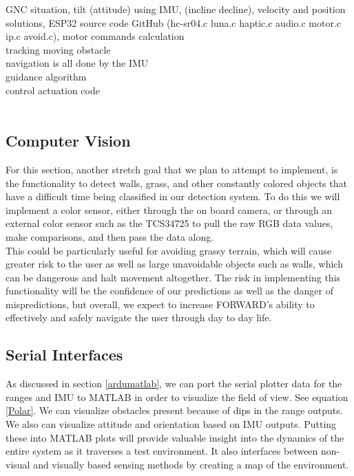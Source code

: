 \noindent GNC situation, tilt (attitude) using IMU, (incline decline), velocity and position solutions, ESP32 source code GitHub (hc-sr04.c luna.c haptic.c audio.c motor.c ip.c avoid.c), motor commands calculation\\

tracking moving obstacle\\

navigation is all done by the IMU\\

guidance algorithm\\

control actuation code\\  

\\

\subsection{Computer Vision}
\noindent For this section, another stretch goal that we plan to attempt to implement, is the functionality to detect walls, grass, and other constantly colored objects that have a difficult time being classified in our detection system. To do this we will implement a color sensor, either through the on board camera, or through an external color sensor such as the TCS34725 to pull the raw RGB data values, make comparisons, and then pass the data along. \\

\noindent This could be particularly useful for avoiding grassy terrain, which will cause greater risk to the user as well as large unavoidable objects such as walls, which can be dangerous and halt movement altogether. The risk in implementing this functionality will be the confidence of our predictions as well as the danger of mispredictions, but overall, we expect to increase FORWARD's ability to effectively and safely navigate the user through day to day life. \\


\subsection{Serial Interfaces}
\noindent As discussed in section \ref{ardumatlab}, we can port the serial plotter data for the ranges and IMU to MATLAB in order to visualize the field of view. See equation \ref{Polar}. We can visualize obstacles present because of dips in the range outputs. We also can visualize attitude and orientation based on IMU outputs. Putting these into MATLAB plots will provide valuable insight into the dynamics of the entire system as it traverses a test environment. It also interfaces between non-visual and visually based sensing methods by creating a map of the environment.\\

